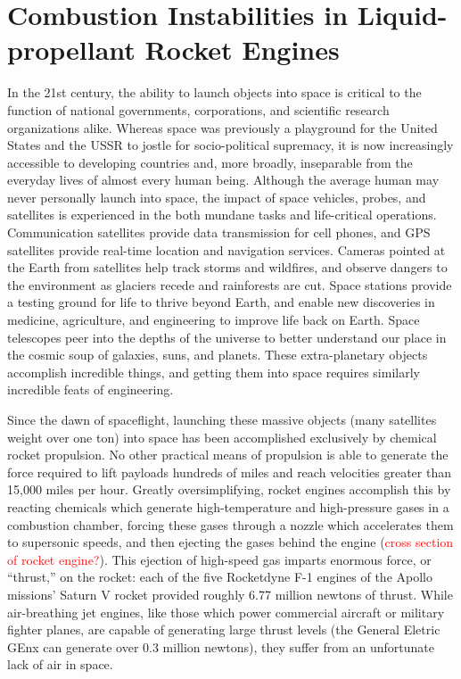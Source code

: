 \section{Combustion Instabilities in Liquid-propellant Rocket Engines}

In the 21st century, the ability to launch objects into space is critical to the function of national governments, corporations, and scientific research organizations alike. Whereas space was previously a playground for the United States and the USSR to jostle for socio-political supremacy, it is now increasingly accessible to developing countries and, more broadly, inseparable from the everyday lives of almost every human being. Although the average human may never personally launch into space, the impact of space vehicles, probes, and satellites is experienced in the both mundane tasks and life-critical operations. Communication satellites provide data transmission for cell phones, and GPS satellites provide real-time location and navigation services. Cameras pointed at the Earth from satellites help track storms and wildfires, and observe dangers to the environment as glaciers recede and rainforests are cut. Space stations provide a testing ground for life to thrive beyond Earth, and enable new discoveries in medicine, agriculture, and engineering to improve life back on Earth. Space telescopes peer into the depths of the universe to better understand our place in the cosmic soup of galaxies, suns, and planets. These extra-planetary objects accomplish incredible things, and getting them into space requires similarly incredible feats of engineering.

Since the dawn of spaceflight, launching these massive objects (many satellites weight over one ton) into space has been accomplished exclusively by chemical rocket propulsion. No other practical means of propulsion is able to generate the force required to lift payloads hundreds of miles and reach velocities greater than 15,000 miles per hour. Greatly oversimplifying, rocket engines accomplish this by reacting chemicals which generate high-temperature and high-pressure gases in a combustion chamber, forcing these gases through a nozzle which accelerates them to supersonic speeds, and then ejecting the gases behind the engine (\textcolor{red}{cross section of rocket engine?}). This ejection of high-speed gas imparts enormous force, or ``thrust,'' on the rocket: each of the five Rocketdyne F-1 engines of the Apollo missions' Saturn V rocket provided roughly 6.77 million newtons of thrust. While air-breathing jet engines, like those which power commercial aircraft or military fighter planes, are capable of generating large thrust levels (the General Eletric GEnx can generate over 0.3 million newtons), they suffer from an unfortunate lack of air in space.

